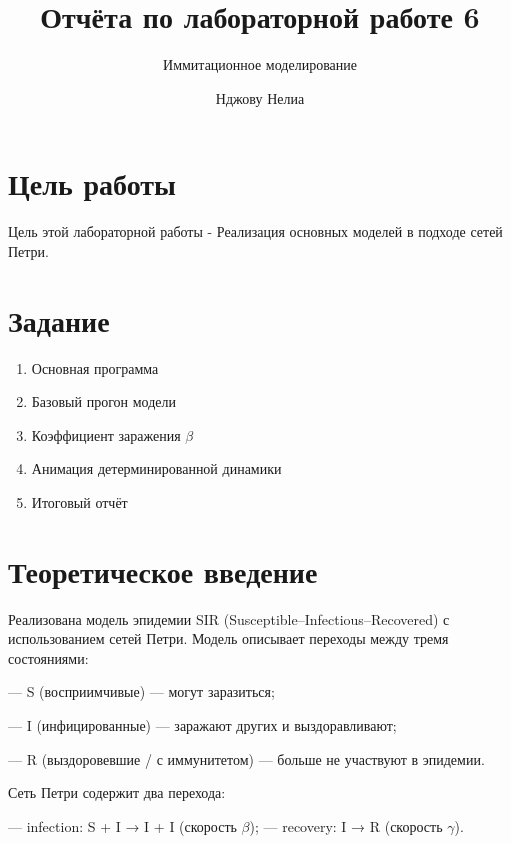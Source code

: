 \documentclass[
  12pt,
  a4paper,
  DIV=11,
  numbers=noendperiod]{scrreprt}
\title{Отчёта по лабораторной работе 6}
\subtitle{Иммитационное моделирование}
\author{Нджову Нелиа}
\date{}
\renewcommand*\contentsname{Содержание}
\newcommand\contentsname{Содержание}
\begin{document}
\maketitle

\renewcommand*\contentsname{Содержание}
{
\setcounter{tocdepth}{1}
\tableofcontents
}
\listoffigures
\listoftables
{}
\chapter{Цель
работы}\label{ux446ux435ux43bux44c-ux440ux430ux431ux43eux442ux44b}

Цель этой лабораторной работы - Реализация основных моделей в подходе
сетей Петри.

\chapter{Задание}\label{ux437ux430ux434ux430ux43dux438ux435}

\begin{enumerate}
\def\labelenumi{\arabic{enumi}.}
\item
  Основная программа
\item
  Базовый прогон модели
\item
  Коэффициент заражения \(\beta\)
\item
  Анимация детерминированной динамики
\item
  Итоговый отчёт
\end{enumerate}

\chapter{Теоретическое
введение}\label{ux442ux435ux43eux440ux435ux442ux438ux447ux435ux441ux43aux43eux435-ux432ux432ux435ux434ux435ux43dux438ux435}

Реализована модель эпидемии SIR (Susceptible--Infectious--Recovered) с
использованием сетей Петри. Модель описывает переходы между тремя
состояниями:

--- S (восприимчивые) --- могут заразиться;

--- I (инфицированные) --- заражают других и выздоравливают;

--- R (выздоровевшие / с иммунитетом) --- больше не участвуют в
эпидемии.

Сеть Петри содержит два перехода:

--- infection: S + I → I + I (скорость \(\beta\)); --- recovery: I → R
(скорость \(\gamma\)).
\end{document}
